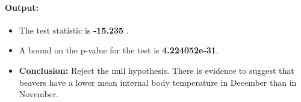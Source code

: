 \paragraph{\textbf{Output:}}
\begin{itemize}
    \item The test statistic is \textbf{-15.235 }.
    \item A bound on the p-value for the test is \textbf{4.224052e-31}.
    \item \textbf{Conclusion:} Reject the null hypothesis. There is evidence to suggest that beavers have a lower mean internal body temperature in December than in November.
\end{itemize}